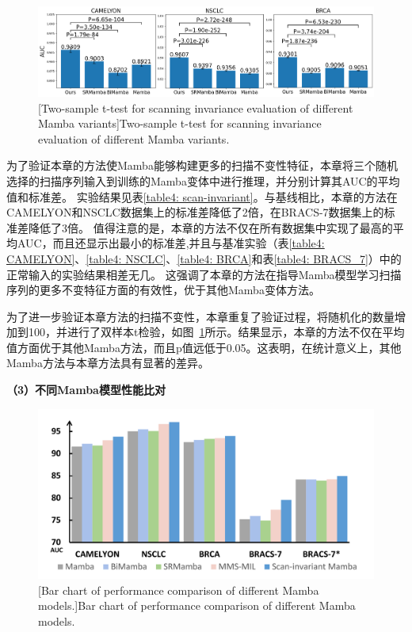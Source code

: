 \begin{figure}[h!]
  \centering
  \includegraphics[width=1.0\columnwidth]{figures/scan_invariant.png}
  [Two-sample t-test for scanning invariance evaluation of different Mamba variants]{Two-sample t-test for scanning invariance evaluation of different Mamba variants.}
  \label{figure4: scan-invariant}
\end{figure}

为了验证本章的方法使Mamba能够构建更多的扫描不变性特征，本章将三个随机选择的扫描序列输入到训练的Mamba变体中进行推理，并分别计算其AUC的平均值和标准差。
实验结果见表\ref{table4: scan-invariant}。与基线相比，本章的方法在CAMELYON和NSCLC数据集上的标准差降低了2倍，在BRACS-7数据集上的标准差降低了3倍。
值得注意的是，本章的方法不仅在所有数据集中实现了最高的平均AUC，而且还显示出最小的标准差,并且与基准实验（表\ref{table4: CAMELYON}、\ref{table4: NSCLC}、\ref{table4: BRCA}和表\ref{table4: BRACS_7}）中的正常输入的实验结果相差无几。
这强调了本章的方法在指导Mamba模型学习扫描序列的更多不变特征方面的有效性，优于其他Mamba变体方法。

为了进一步验证本章方法的扫描不变性，本章重复了验证过程，将随机化的数量增加到100，并进行了双样本t检验，如图~\ref{figure4: scan-invariant}所示。结果显示，本章的方法不仅在平均值方面优于其他Mamba方法，而且p值远低于0.05。这表明，在统计意义上，其他Mamba方法与本章方法具有显著的差异。

\textbf{（3）不同Mamba模型性能比对}

\begin{figure}[h!]
  \centering
  \includegraphics[width=0.9\columnwidth]{figures/SMCMIL的不同Mamba比较.pdf}
  [Bar chart of performance comparison of different Mamba models.]{Bar chart of performance comparison of different Mamba models.}
  \label{figure4: DifferentMamba}
\end{figure}

